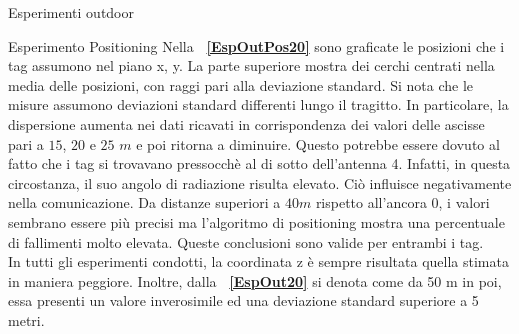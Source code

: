 \documentclass[12pt]{report}
\begin{document}
\begin{section}{Esperimenti outdoor}
\begin{subsection}{Esperimento Positioning}
			Nella \textbf{\figurename~\ref{EspOutPos20}} sono graficate le posizioni che i tag assumono nel piano x, y. La parte superiore mostra dei cerchi centrati nella media delle posizioni, con raggi pari alla deviazione standard. Si nota che le misure assumono deviazioni standard differenti lungo il tragitto. In 							particolare, la dispersione aumenta nei dati ricavati in corrispondenza dei valori delle ascisse pari a $15$, $20$ e $25$ $m$ e poi ritorna a diminuire. Questo potrebbe essere dovuto al fatto che i tag si trovavano pressocchè al di sotto dell’antenna 4. Infatti, in questa circostanza, il suo angolo di radiazione 							risulta elevato. Ciò influisce negativamente nella comunicazione. Da  distanze superiori a $40m$ rispetto all'ancora 0, i valori sembrano essere più precisi ma l’algoritmo di positioning mostra una percentuale di fallimenti molto elevata. Queste conclusioni sono valide per entrambi i tag. \\ In tutti gli esperimenti 					condotti, la coordinata z è sempre risultata quella stimata in maniera peggiore. Inoltre, dalla \textbf{\tablename~\ref{EspOut20}} si denota come da 50 m in poi, essa presenti un valore inverosimile ed una deviazione standard superiore a 5 metri. 
			\begin{table}[H]
				\centering
{}
\end{table}
\end{subsection}
\end{section}
\end{document}

